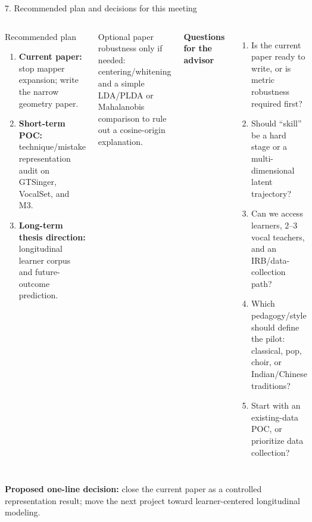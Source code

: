\documentclass[aspectratio=169,10pt]{ctexbeamer}
\begin{document}
\begin{frame}{7. Recommended plan and decisions for this meeting}
\begin{columns}[T,onlytextwidth]
\begin{block}{Recommended plan}
\small
\begin{enumerate}
  \item \textbf{Current paper:} stop mapper expansion; write the narrow geometry paper.
  \item \textbf{Short-term POC:} technique/mistake representation audit on GTSinger, VocalSet, and M3.
  \item \textbf{Long-term thesis direction:} longitudinal learner corpus and future-outcome prediction.
\end{enumerate}
\end{block}

\small
Optional paper robustness only if needed: centering/whitening and a simple LDA/PLDA or Mahalanobis comparison to rule out a cosine-origin explanation.

\textbf{Questions for the advisor}
\small
\begin{enumerate}
  \item Is the current paper ready to write, or is metric robustness required first?
  \item Should ``skill'' be a hard stage or a multi-dimensional latent trajectory?
  \item Can we access learners, 2--3 vocal teachers, and an IRB/data-collection path?
  \item Which pedagogy/style should define the pilot: classical, pop, choir, or Indian/Chinese traditions?
  \item Start with an existing-data POC, or prioritize data collection?
\end{enumerate}
\end{columns}

\vfill
\centering
\large\color{Navy}
\textbf{Proposed one-line decision:} close the current paper as a controlled representation result; move the next project toward learner-centered longitudinal modeling.
\end{frame}
\end{document}
